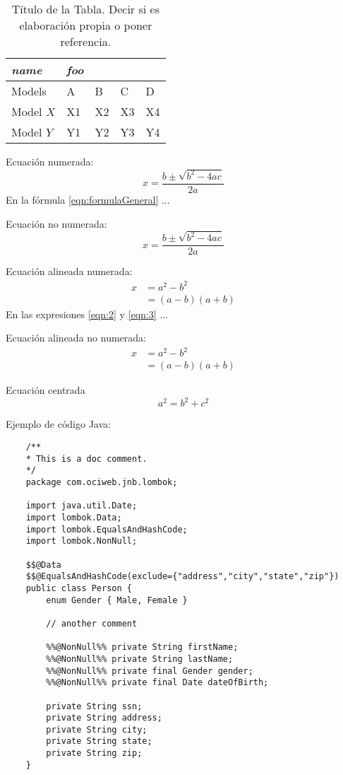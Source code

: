\documentclass[fleqn]{Paquetes/RevDigMatEduInt}
\begin{document}
\begin{table}[ht!!!]
	\centering
	\begin{minipage}{0.7\textwidth}
	\caption{Título de la Tabla. Decir si es elaboración propia o poner referencia.}
	\centering
	\begin{tabular}{*5l}    \toprule
		\emph{name} & \emph{foo} & & &  \\ \midrule
		Models    & A  & B  & C  & D  \\ 
		Model $X$ & X1 & X2 & X3 & X4\\ 
		Model $Y$ & Y1 & Y2 & Y3 & Y4\\ \bottomrule
	\end{tabular}
	\label{tabla:nombre}
	\end{minipage}
\end{table}


Ecuación numerada:
\begin{equation}
	x=\frac{b\pm \sqrt{b^2-4ac}}{2a}
	\label{eqn:formulaGeneral}
\end{equation}
En la fórmula \ref{eqn:formulaGeneral} ...

Ecuación no numerada:
\begin{equation*}
	x=\frac{b\pm \sqrt{b^2-4ac}}{2a}
\end{equation*}

Ecuación alineada numerada:
\begin{align}
	x & = a^2-b^2 \label{eqn:2}\\
	& = (a-b)(a+b) \label{eqn:3}
\end{align}
En las expresiones \ref{eqn:2} y \ref{eqn:3} ...

Ecuación alineada no numerada:
\begin{align*}
	x & = a^2-b^2 \\
	& = (a-b)(a+b)
\end{align*}

Ecuación centrada \[ a^2=b^2+c^2 \]


Ejemplo de código Java:

\begin{lstlisting}
	/**
	* This is a doc comment.
	*/
	package com.ociweb.jnb.lombok;
	
	import java.util.Date;
	import lombok.Data;
	import lombok.EqualsAndHashCode;
	import lombok.NonNull;
	
	$$@Data
	$$@EqualsAndHashCode(exclude={"address","city","state","zip"})
	public class Person {
		enum Gender { Male, Female }
		
		// another comment
		
		%%@NonNull%% private String firstName;
		%%@NonNull%% private String lastName;
		%%@NonNull%% private final Gender gender;
		%%@NonNull%% private final Date dateOfBirth;
		
		private String ssn;
		private String address;
		private String city;
		private String state;
		private String zip;
	}
\end{lstlisting}
\end{document}
